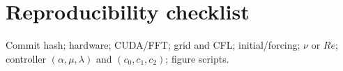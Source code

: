\section{Reproducibility checklist}
Commit hash; hardware; CUDA/FFT; grid and CFL; initial/forcing; $\nu$ or $Re$; controller $(\alpha,\mu,\lambda)$ and $(c_0,c_1,c_2)$; figure scripts.
